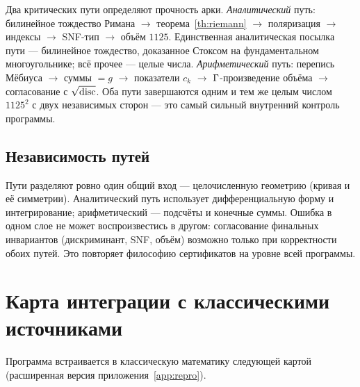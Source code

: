 Два критических пути определяют прочность арки. \emph{Аналитический}
путь: билинейное тождество Римана $\to$ теорема~\ref{th:riemann}
$\to$ поляризация $\to$ индексы $\to$ SNF-тип $\to$ объём $1125$.
Единственная аналитическая посылка пути --- билинейное тождество,
доказанное Стоксом на фундаментальном многоугольнике; всё прочее
--- целые числа. \emph{Арифметический} путь: перепись Мёбиуса
$\to$ суммы $=g$ $\to$ показатели $c_k$ $\to$ $\Gamma$-произведение
объёма $\to$ согласование с $\sqrt{\operatorname{disc}}$. Оба пути завершаются
одним и тем же целым числом $1125^2$ с двух независимых сторон ---
это самый сильный внутренний контроль программы.

\subsection{Независимость путей}

Пути разделяют ровно один общий вход --- целочисленную геометрию
(кривая и её симметрии). Аналитический путь использует
дифференциальную форму и интегрирование; арифметический ---
подсчёты и конечные суммы. Ошибка в одном слое не может
воспроизвестись в другом: согласование финальных инвариантов
(дискриминант, SNF, объём) возможно только при корректности обоих
путей. Это повторяет философию сертификатов на уровне всей
программы.

\section{Карта интеграции с классическими источниками}
\label{app:integration}

Программа встраивается в классическую математику следующей картой
(расширенная версия приложения~\ref{app:repro}).

